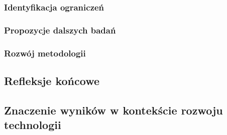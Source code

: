 \subsubsection{Identyfikacja ograniczeń}

\subsubsection{Propozycje dalszych badań}

\subsubsection{Rozwój metodologii}

\subsection{Refleksje końcowe}

\subsection{Znaczenie wyników w kontekście rozwoju technologii}

